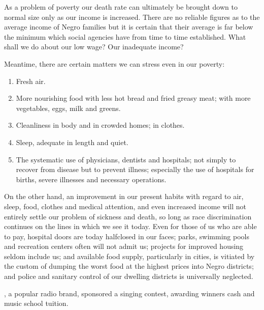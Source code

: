 \documentclass[letterpaper,10pt,english]{jupyterBook}
\begin{document}
\sphinxAtStartPar
As a problem of poverty our death rate can ultimately be brought down to normal size only as our income is increased. There are no reliable figures as to the average income of Negro families but it is certain that their average is far below the minimum which social agencies have from time to time established. What shall we do about our low wage? Our inadequate income?

\sphinxAtStartPar
Meantime, there are certain matters we can stress even in our poverty:
\begin{enumerate}
%
\item {} 
\sphinxAtStartPar
Fresh air.

\item {} 
\sphinxAtStartPar
More nourishing food with less hot bread and fried greasy meat; with more vegetables, eggs, milk and greens.

\item {} 
\sphinxAtStartPar
Cleanliness in body and in crowded homes; in clothes.

\item {} 
\sphinxAtStartPar
Sleep, adequate in length and quiet.

\item {} 
\sphinxAtStartPar
The systematic use of physicians, dentists and hospitals; not simply to recover from disease but to prevent illness; especially the use of hospitals for births, severe illnesses and necessary operations.

\end{enumerate}

\sphinxAtStartPar
On the other hand, an improvement in our present habits with regard to air, sleep, food, clothes and medical attention, and even increased income will not entirely settle our problem of sickness and death, so long as race discrimination continues on the lines in which we see it today. Even for those of us who are able to pay, hospital doors are today half\sphinxhyphen{}closed in our faces; parks, swimming pools and recreation centers often will not admit us; projects for improved housing seldom include us; and available food supply, particularly in cities, is vitiated by the custom of dumping the worst food at the highest prices into Negro districts; and police and sanitary control of our dwelling districts is universally neglected.

\begin{sphinxShadowBox}
\sphinxstylesidebartitle{}

\sphinxAtStartPar
{}, a popular radio brand, sponsored a singing contest, awarding winners cash and music school tuition.
\end{sphinxShadowBox}
\end{document}
